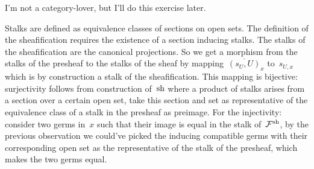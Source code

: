 \begin{exercise} %
  I'm not a category-lover, but I'll do this exercise later.
\end{exercise}

\begin{exercise} %
  Stalks are defined as equivalence classes of sections on open sets. The definition of the sheafification requires the existence of a section inducing stalks. The stalks of the sheafification are the canonical projections. So we get a morphism from the stalks of the presheaf to the stalks of the sheaf by mapping~$\overline{(s_U,U)}_x$ to~$s_{U,x}$ which is by construction a stalk of the sheafification. This mapping is bijective: surjectivity follows from construction of~$\operatorname{sh}$ where a product of stalks arises from a section over a certain open set, take this section and set as representative of the equivalence class of a stalk in the presheaf as preimage. For the injectivity: consider two germs in~$x$ such that their image is equal in the stalk of~$\mathcal{F}^{\operatorname{sh}}$, by the previous observation we could've picked the inducing compatible germs with their corresponding open set as the representative of the stalk of the presheaf, which makes the two germs equal.
\end{exercise}


